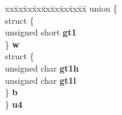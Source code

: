 \begin{DoxyCompactItemize}
\begin{tabbing}
\end{tabbing}\item 
\mbox{\label{structcd2401__regs___a3712ffbdcceab35928c6fed01eed13c6}} 
\begin{tabbing}
xx\=xx\=xx\=xx\=xx\=xx\=xx\=xx\=xx\=\kill
union \{\\
\>struct \{\\
\>\>unsigned short {\bfseries gt1}\\
\>\} {\bfseries w}\\
\>struct \{\\
\>\>unsigned char {\bfseries gt1h}\\
\>\>unsigned char {\bfseries gt1l}\\
\>\} {\bfseries b}\\
\} {\bfseries u4}\\


\end{tabbing}
\end{DoxyCompactItemize}
